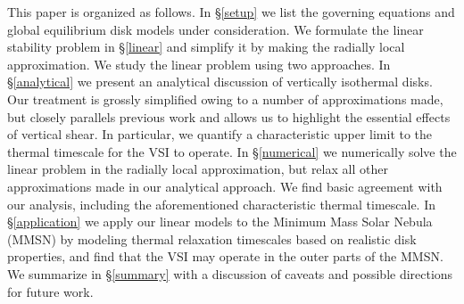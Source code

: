 \documentclass[iop]{emulateapj}
\begin{document}
This paper is organized as follows. In \S\ref{setup} we list the
governing equations and global equilibrium disk models under
consideration. We formulate the linear stability problem in
\S\ref{linear} and simplify it by making the radially local
approximation. We study the linear problem using two approaches. In
\S\ref{analytical} we present an analytical discussion of vertically
isothermal disks. Our treatment is grossly simplified owing to a
number of approximations made, but closely parallels previous work and 
allows us to highlight the essential effects of vertical shear. In
particular, we quantify a characteristic upper limit to the thermal
timescale for the VSI to operate. In \S\ref{numerical} we numerically
solve the linear problem in the radially local approximation, but
relax all other approximations made in our analytical approach.    
We find basic agreement with our analysis, including
the aforementioned characteristic thermal timescale. In
\S\ref{application} we apply our linear models to the Minimum Mass
Solar Nebula (MMSN) by modeling thermal relaxation
timescales based on realistic disk properties, and find that the VSI may
operate in the outer parts of the MMSN. We summarize in
\S\ref{summary} with a discussion of caveats and possible directions
for future work.  





 


\appendix




\end{document}
